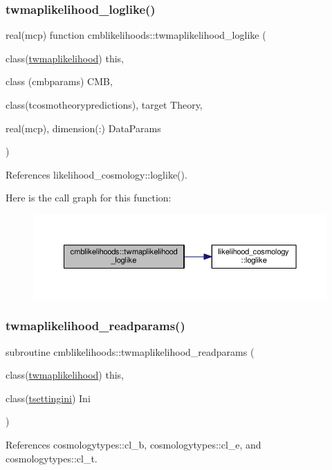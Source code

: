 \subsubsection{\texorpdfstring{twmaplikelihood\+\_\+loglike()}{twmaplikelihood\_loglike()}}
{\footnotesize\ttfamily real(mcp) function cmblikelihoods\+::twmaplikelihood\+\_\+loglike (\begin{DoxyParamCaption}\item[{class(\mbox{\hyperlink{structcmblikelihoods_1_1twmaplikelihood}{twmaplikelihood}})}]{this,  }\item[{class (cmbparams)}]{C\+MB,  }\item[{class(tcosmotheorypredictions), target}]{Theory,  }\item[{real(mcp), dimension(\+:)}]{Data\+Params }\end{DoxyParamCaption})}



References likelihood\+\_\+cosmology\+::loglike().

Here is the call graph for this function\+:
\nopagebreak
\begin{figure}[H]
\begin{center}
\leavevmode
\includegraphics[width=350pt]{namespacecmblikelihoods_a7c01807a08609a029a41a11b39ade069_cgraph}
\end{center}
\end{figure}
\mbox{\label{namespacecmblikelihoods_a38cdfcee85309289ed17ecc5b60d5ff7}} 
\subsubsection{\texorpdfstring{twmaplikelihood\+\_\+readparams()}{twmaplikelihood\_readparams()}}
{\footnotesize\ttfamily subroutine cmblikelihoods\+::twmaplikelihood\+\_\+readparams (\begin{DoxyParamCaption}\item[{class(\mbox{\hyperlink{structcmblikelihoods_1_1twmaplikelihood}{twmaplikelihood}})}]{this,  }\item[{class(\mbox{\hyperlink{structsettings_1_1tsettingini}{tsettingini}})}]{Ini }\end{DoxyParamCaption})\hspace{0.3cm}{\ttfamily [private]}}



References cosmologytypes\+::cl\+\_\+b, cosmologytypes\+::cl\+\_\+e, and cosmologytypes\+::cl\+\_\+t.

